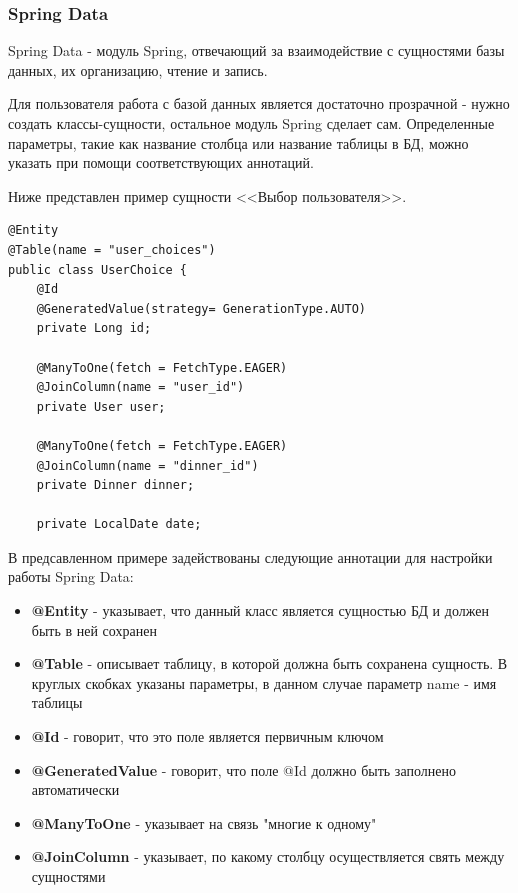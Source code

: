\documentclass[a4paper]{article}
\begin{document}
\subsubsection{Spring Data}   

Spring Data - модуль Spring, отвечающий за взаимодействие с сущностями базы данных, их организацию, чтение и запись.

Для пользователя работа с базой данных является достаточно прозрачной - нужно создать классы-сущности, остальное модуль Spring сделает сам. Определенные параметры, такие как название столбца или название таблицы в БД, можно указать при помощи соответствующих аннотаций. 

Ниже представлен пример сущности <<Выбор пользователя>>.
\hfill\break
{}         
\begin{lstlisting}[label=lis2,caption=Пример сущности <<Выбор пользователя>>] 
@Entity
@Table(name = "user_choices")
public class UserChoice {
    @Id
    @GeneratedValue(strategy= GenerationType.AUTO)
    private Long id;

    @ManyToOne(fetch = FetchType.EAGER)
    @JoinColumn(name = "user_id")
    private User user;

    @ManyToOne(fetch = FetchType.EAGER)
    @JoinColumn(name = "dinner_id")
    private Dinner dinner;

    private LocalDate date;
\end{lstlisting}

В предсавленном примере задействованы следующие аннотации для настройки работы Spring Data:

\begin{itemize}
\setlength{\itemsep}{-2mm}
	\item \textbf{@Entity} - указывает, что данный класс является сущностью БД и должен быть в ней сохранен
	\item \textbf{@Table} - описывает таблицу, в которой должна быть сохранена сущность. В круглых скобках указаны параметры, в данном случае параметр name - имя таблицы
	\item \textbf{@Id} - говорит, что это поле является первичным ключом
	\item \textbf{@GeneratedValue} - говорит, что поле @Id должно быть заполнено автоматически
	\item \textbf{@ManyToOne} - указывает на связь "многие к одному"
	\item \textbf{@JoinColumn} - указывает, по какому столбцу осуществляется свять между сущностями
\end{itemize}
\end{document}
